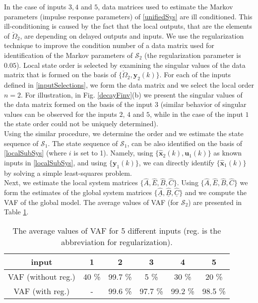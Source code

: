 \documentclass[journal,10pt]{IEEEtran}
\begin{document}
In the case of inputs $3,4$ and $5$, data matrices used to estimate the Markov parameters (impulse response parameters) of \eqref{unifiedSys} are ill conditioned. This ill-conditioning is caused by the fact that the local outputs, that are the elements of $\breve{\Omega}_{2}$, are depending on delayed outputs and inputs. We use the regularization technique to improve the condition number of a data matrix used for identification of the Markov parameters of  $\mathcal{S}_{2}$ (the regularization parameter is $0.05$). Local state order is selected by examining the singular values of the data matrix that is formed on the basis of $\{\breve{\Omega}_{2}, \mathbf{y}_{2}(k)\}$. For each of the inputs defined in \eqref{inputSelections}, we form the data matrix and we select the local order $n=2$. For illustration, in Fig. \ref{decayFinv}(b) we present the singular values of the data matrix formed on the basis of the input 3 (similar behavior of singular values can be observed for the inputs $2$, $4$ and $5$, while in the case of the input $1$ the state order could not be uniquely determined). 
\\
Using the similar procedure, we determine the order and we estimate the state sequence of $\mathcal{S}_{1}$. The state sequence of $\mathcal{S}_{1}$, can be also identified on the basis of \eqref{localSubSys} (where $i$ is set to 1). Namely, using $\{\hat{\mathbf{x}}_{2}(k),\mathbf{u}_{1}(k) \}$ as known inputs in \eqref{localSubSys}, and using $\{\mathbf{y}_{1}(k) \}$, we can directly identify $\{\hat{\mathbf{x}}_{1}(k)\}$ by solving a simple least-squares problem. \\
Next, we estimate the local system matrices $\{\hat{A},\hat{E},\hat{B},\hat{C}\}$. Using $\{\hat{A},\hat{E},\hat{B},\hat{C}\}$ we form the estimates of the global system matrices $\{\underline{\hat{A}},\underline{\hat{B}},\underline{\hat{C}}\}$ and we compute the VAF of the global model. The average values of VAF (for $\mathcal{S}_{2}$) are presented in Table \ref{tab:VAF}.
\par
\begin{tiny}\begin{table}[H]
\centering
\begin{tabular}{ |c | c | c | c |c|c|}
\hline
input                              &    1               &        2                &             3            &               4          &     5\\
\hline
VAF  (without reg.)                              &   40 \%          &         99.7 \%    &       5 \%             &           30 \%      &      20 \%  \\
\hline      
VAF (with reg.)        &     -              &          99.6 \%       &        97.7 \%         &         99.2 \%     &      98.5 \% \\
\hline
\end{tabular}
\caption{\small{The average values of VAF for 5 different inputs (reg. is the abbreviation for regularization).}}
\label{tab:VAF}
\end{table}\end{tiny}
\end{document}
